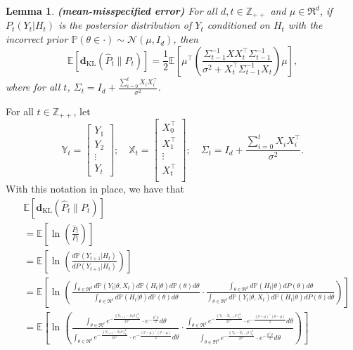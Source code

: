 \documentclass[twoside,11pt]{article}
\renewenvironment{proof}{\par\noindent{\bf Proof\ }}{\hfill\BlackBox\\[2mm]}
\newenvironment{proof}{\par\noindent{\bf Proof\ }}{\hfill\BlackBox\\[2mm]}
\newtheorem{lemma}[theorem]{Lemma}
\def\KL{\mathbf{d}_{\mathrm{KL}}}
\def\normal{\mathcal{N}}
\def\E{\mathbb{E}}
\def\Pr{\mathbb{P}}
\begin{document}
\begin{lemma}{\bf (mean-misspecified error)}
    \label{le:kl_matrix}
    For all $d, t \in \mathbb{Z}_{++}$ and $\mu \in \Re^d$, if $P_t(Y_t|H_t)$ is the postersior distribution of $Y_t$ conditioned on $H_t$ with the incorrect prior $\Pr(\theta\in\cdot)\sim \normal(\mu, I_d)$, then
    $$\E\left[\KL(\hat{P}_t\|P_t)\right] = \frac{1}{2}\E\left[\mu^\top\left(\frac{\Sigma^{-1}_{t-1}XX_t^\top\Sigma^{-1}_{t-1}}{\sigma^2 + X_t^\top \Sigma^{-1}_{t-1} X_t}\right)\mu\right],$$
    where for all $t$, $\Sigma_t = I_d + \frac{\sum_{i=0}^{t} X_iX_i^\top}{\sigma^2}$.
\end{lemma}
\begin{proof}
    For all $t \in \mathbb{Z}_{++}$, let
    $$\mathbb{Y}_{t} =
        \begin{bmatrix}
            Y_1\\
            Y_2\\
            \vdots\\
            Y_t
        \end{bmatrix};
        \quad \mathbb{X}_t = 
        \begin{bmatrix}
            X_0^\top\\
            X_1^\top\\
            \vdots\\
            X_t^\top\\
        \end{bmatrix};
        \quad \Sigma_t = I_d + \frac{\sum_{i=0}^{t} X_iX_i^\top}{\sigma^2}.
    $$
    With this notation in place, we have that
    \begin{align*}
        & \E\left[\KL(\hat{P}_t\|P_t)\right]\\
        & = \E\left[\ln\left(\frac{\hat{P}_t}{P_t}\right)\right]\\
        & = \E\left[\ln\left(\frac{d\Pr(Y_{t+1}|H_t)}{dP(Y_{t+1}|H_t)}\right)\right]\\
        & = \E\left[\ln\left(\frac{\int_{\theta\in\Re^d}d\Pr(Y_t|\theta, X_t)d\Pr(H_t|\theta)d\Pr(\theta)d\theta}{\int_{\theta\in\Re^d}d\Pr(H_t|\theta)d\Pr(\theta) d\theta} \cdot \frac{\int_{\theta\in\Re^d}d\Pr(H_t|\theta)dP(\theta) d\theta}{\int_{\theta\in\Re^d}d\Pr(Y_t|\theta, X_t)d\Pr(H_t|\theta)dP(\theta)d\theta}\right)\right]\\
        & = \E\left[\ln\left(\frac{\int_{\theta\in\Re^d}e^{-\frac{\|\mathbb{Y}_{t+1} - \mathbb{X}_{t}\theta\|^2_2}{2\sigma^2}}\cdot e^{-\frac{\theta^\top\theta}{2}}d\theta}{\int_{\theta\in\Re^d}e^{-\frac{\|\mathbb{Y}_{t+1} - \mathbb{X}_{t}\theta\|^2_2}{2\sigma^2}}\cdot e^{-\frac{(\theta-\mu)^\top(\theta-\mu)}{2}}d\theta}\cdot \frac{\int_{\theta\in\Re^d}e^{-\frac{\|\mathbb{Y}_{t} - \tilde{\mathbb{X}}_{t-1}\theta\|^2_2}{2\sigma^2}}\cdot e^{-\frac{(\theta-\mu)^\top(\theta-\mu)}{2}}d\theta}{\int_{\theta\in\Re^d}e^{-\frac{\|\mathbb{Y}_{t} - \tilde{\mathbb{X}}_{t-1}\theta\|^2_2}{2\sigma^2}}\cdot e^{-\frac{\theta^\top\theta}{2}}d\theta}\right)\right]\\

\end{align*}
\end{proof}
\end{document}
